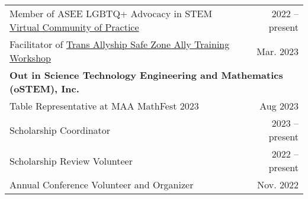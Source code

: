 \documentclass[letterpaper,11pt]{article}
\begin{document}
\begin{longtable}{@{}p{}r@{}}
  \hspace{3mm} \small Member of ASEE LGBTQ+ Advocacy in STEM \href{https://lgbtq.asee.org/our-community/}{Virtual Community of Practice}                                                                                 & 2022 -- present                                                             \\
  \hspace{3mm} \small Facilitator of \href{https://lgbtq.asee.org/ally-training/online-workshops/#:~:text=Safe\%20Zone\%20Ally\%20Training\%3A\%20Tans\%20Allyship}{Trans Allyship Safe Zone Ally Training Workshop}     & Mar. 2023                                                                   \\ [4pt]
  \multicolumn{2}{l}{\hspace{-3mm} \bf{Out in Science Technology Engineering and Mathematics (oSTEM), Inc.}}                                                                                                                                                                                           \\
  \hspace{3mm} \small Table Representative at MAA MathFest 2023                                                                                                                                                          & Aug 2023                                                                    \\
  \hspace{3mm} \small Scholarship Coordinator                                                                                                                                                                            & 2023 -- present                                                             \\
  \hspace{3mm} \small Scholarship Review Volunteer                                                                                                                                                                       & 2022 -- present                                                             \\
  \hspace{3mm} \small Annual Conference Volunteer and Organizer                                                                                                                                                          & Nov. 2022                                                                   \\

\end{longtable}
\end{document}
